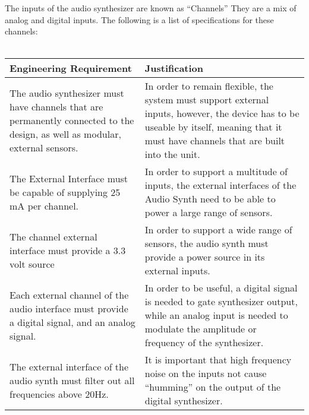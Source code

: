 \documentclass{article}
\begin{document}
The inputs of the audio synthesizer are known as ``Channels'' They are
a mix of analog and digital inputs. The following is a list of
specifications for these channels:
\\
\\
\begin{tabular}{|p{3in}|p{3in}|}
\hline
Engineering Requirement & Justification \\
\hline

The audio synthesizer must have channels that are permanently
connected to the design, as well as modular, external sensors. & In
order to remain flexible, the system must support external inputs,
however, the device has to be useable by itself, meaning that it must
have channels that are built into the unit. \\

\hline

The External Interface must be capable of supplying 25 mA per channel.
& In order to support a multitude of inputs, the external interfaces
of the Audio Synth need to be able to power a large range of sensors.\\

\hline

The channel external interface must provide a 3.3 volt source & In
order to support a wide range of sensors, the audio synth must provide
a power source in its external inputs. \\

\hline

Each external channel of the audio interface must provide a digital
signal, and an analog signal. & In order to be useful, a digital
signal is needed to gate synthesizer output, while an analog input is
needed to modulate the amplitude or frequency of the synthesizer.\\

\hline 

The external interface of the audio synth must filter out all
frequencies above 20Hz. & It is important that high frequency noise on
the inputs not cause ``humming'' on the output of the digital
synthesizer.\\

\hline

\end{tabular}
\end{document}
